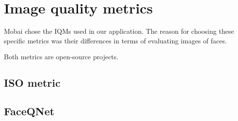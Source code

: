 \begin{figure}[H]
\centering
        \vspace{0.5cm}
        \newline
\end{figure}


\section{Image quality metrics} 
Mobai chose the IQMs used in our application. The reason for choosing these specific metrics was their differences in terms of evaluating images of faces. 

Both metrics are open-source projects. 


\subsection{ISO metric}

\subsection{FaceQNet}